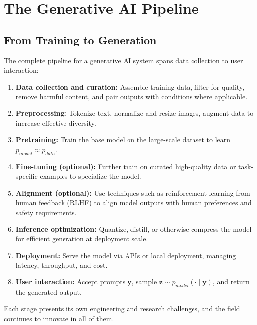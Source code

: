 \documentclass{book}
\begin{document}
\section{The Generative AI Pipeline}

\subsection{From Training to Generation}

The complete pipeline for a generative AI system spans data collection to user
interaction:

\begin{enumerate}
\item \textbf{Data collection and curation:} Assemble training data, filter
      for quality, remove harmful content, and pair outputs with conditions
      where applicable.

\item \textbf{Preprocessing:} Tokenize text, normalize and resize images,
      augment data to increase effective diversity.

\item \textbf{Pretraining:} Train the base model on the large-scale dataset
      to learn $p_{model} \approx p_{data}$.

\item \textbf{Fine-tuning (optional):} Further train on curated high-quality
      data or task-specific examples to specialize the model.

\item \textbf{Alignment (optional):} Use techniques such as reinforcement
      learning from human feedback (RLHF) to align model outputs with human
      preferences and safety requirements.

\item \textbf{Inference optimization:} Quantize, distill, or otherwise
      compress the model for efficient generation at deployment scale.

\item \textbf{Deployment:} Serve the model via APIs or local deployment,
      managing latency, throughput, and cost.

\item \textbf{User interaction:} Accept prompts $\mathbf{y}$, sample
      $\mathbf{z} \sim p_{model}(\cdot \mid \mathbf{y})$, and return the
      generated output.
\end{enumerate}

Each stage presents its own engineering and research challenges, and the field
continues to innovate in all of them.
\end{document}

